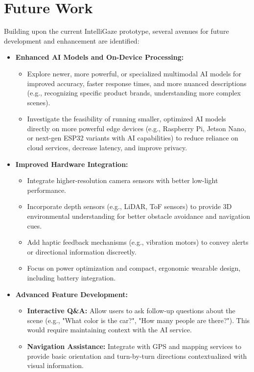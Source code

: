 \documentclass[12pt, a4paper]{report}
\begin{document}
\section{Future Work}
Building upon the current IntelliGaze prototype, several avenues for future development and enhancement are identified:
\begin{itemize}
    \item \textbf{Enhanced AI Models and On-Device Processing:}
        \begin{itemize}
            \item Explore newer, more powerful, or specialized multimodal AI models for improved accuracy, faster response times, and more nuanced descriptions (e.g., recognizing specific product brands, understanding more complex scenes).
            \item Investigate the feasibility of running smaller, optimized AI models directly on more powerful edge devices (e.g., Raspberry Pi, Jetson Nano, or next-gen ESP32 variants with AI capabilities) to reduce reliance on cloud services, decrease latency, and improve privacy.
        \end{itemize}
    \item \textbf{Improved Hardware Integration:}
        \begin{itemize}
            \item Integrate higher-resolution camera sensors with better low-light performance.
            \item Incorporate depth sensors (e.g., LiDAR, ToF sensors) to provide 3D environmental understanding for better obstacle avoidance and navigation cues.
            \item Add haptic feedback mechanisms (e.g., vibration motors) to convey alerts or directional information discreetly.
            \item Focus on power optimization and compact, ergonomic wearable design, including battery integration.
        \end{itemize}
    \item \textbf{Advanced Feature Development:}
        \begin{itemize}
            \item \textbf{Interactive Q\&A:} Allow users to ask follow-up questions about the scene (e.g., "What color is the car?", "How many people are there?"). This would require maintaining context with the AI service.
            \item \textbf{Navigation Assistance:} Integrate with GPS and mapping services to provide basic orientation and turn-by-turn directions contextualized with visual information.

\end{itemize}
\end{itemize}
\end{document}
